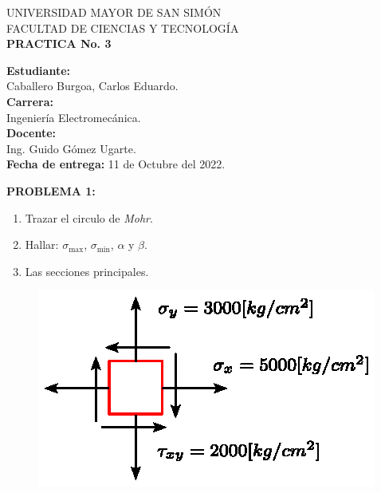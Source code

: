 \documentclass[letter,10pt,twoside]{article}
\newcommand{\blankpage}{
\newpage
\thispagestyle{empty}
\mbox{}
\newpage
}
\begin{document}
\begin{titlepage}
\begin{center}
{\Large UNIVERSIDAD MAYOR DE SAN SIMÓN}\\
\vspace*{0.15cm}
{\large FACULTAD DE CIENCIAS Y TECNOLOGÍA}\\
\vspace*{9.0cm}
{\Large \textbf{PRACTICA No. 3}}\\
\end{center}

\vspace*{7.4cm}
\leftskip=7.95cm
\noindent
\textbf{Estudiante:}\\
Caballero Burgoa, Carlos Eduardo.\\
\textbf{Carrera:}\\
Ingeniería Electromecánica.\\
\newline
\textbf{Docente:}\\
Ing. Guido Gómez Ugarte.\\
\newline
\textbf{Fecha de entrega:} 11 de Octubre del 2022.\\

\end{titlepage}

\blankpage

\colorbox{blue!25}{\textbf{PROBLEMA 1:}}

\begin{enumerate}[label=\alph*)]
    \item Trazar el circulo de \emph{Mohr}.
    \item Hallar: $\sigma_{\text{max}}$, $\sigma_{\text{min}}$, $\alpha$ y
        $\beta$.
    \item Las secciones principales.
\end{enumerate}

\begin{figure}[H]
\centering
\includegraphics[scale=1.2]{resources/f10.eps}
\end{figure}
\end{document}
